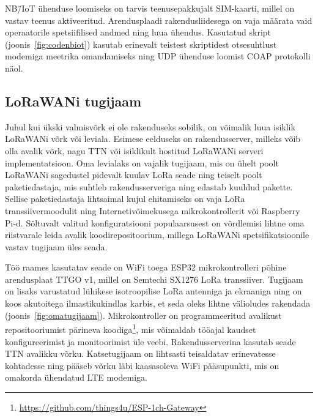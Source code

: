 \documentclass[12pt]{article}
\begin{document}
    NB\=/IoT ühenduse loomiseks on tarvis teenusepakkujalt SIM-kaarti, millel on vastav teenus aktiveeritud.
    Arendusplaadi rakendusliidesega on vaja määrata vaid operaatorile spetsiifilised andmed ning luua ühendus.
    Kasutatud skript (joonis~\ref{fig:codenbiot}) kasutab erinevalt teistest skriptidest otsesuhtlust modemiga meetrika omandamiseks ning UDP ühenduse loomist COAP protokolli näol.
    \newpage
    \subsection{LoRaWANi tugijaam}

    Juhul kui ükski valmisvõrk ei ole rakenduseks sobilik, on võimalik luua isiklik {LoRaWANi} võrk või leviala.
    Esimese eelduseks on rakendusserver, milleks võib olla avalik võrk, nagu TTN või isiklikult hostitud LoRaWANi serveri implementatsioon.
    Oma levialaks on vajalik tugijaam, mis on ühelt poolt LoRaWANi sagedustel pidevalt kuulav LoRa seade ning teiselt poolt paketiedastaja, mis suhtleb rakendusserveriga ning edastab kuuldud pakette.
    Sellise paketiedastaja lihtsaimal kujul ehitamiseks on vaja LoRa transsiivermoodulit ning Internetivõimekusega mikrokontrollerit või Raspberry Pi-d.
    Sõltuvalt valitud konfiguratsiooni populaarsusest on võrdlemisi lihtne oma riistvarale leida avalik koodirepositoorium, millega LoRaWANi spetsifikatsioonile vastav tugijaam üles seada.

    Töö raames kasutatav seade on WiFi toega ESP32 mikrokontrolleri põhine arendusplaat TTGO v1, millel on Semtechi SX1276 LoRa transsiiver.
    Tugijaam on lisaks varustatud lühikese isotroopilise LoRa antenniga ja ekraaniga ning on koos akutoitega ilmastikukindlas karbis, et seda oleks lihtne välioludes rakendada (joonis~\ref{fig:omatugijaam}).
    Mikrokontroller on programmeeritud avalikust repositooriumist pärineva koodiga\footnote{\url{https://github.com/things4u/ESP-1ch-Gateway}}, mis võimaldab tööajal kaudset konfigureerimist ja monitoorimist üle veebi.
    Rakendusserverina kasutab seade TTN avalikku võrku.
    Katsetugijaam on lihtsasti teisaldatav erinevatesse kohtadesse ning pääseb võrku läbi kaasasoleva WiFi pääsupunkti, mis on omakorda ühendatud LTE modemiga.
\end{document}
